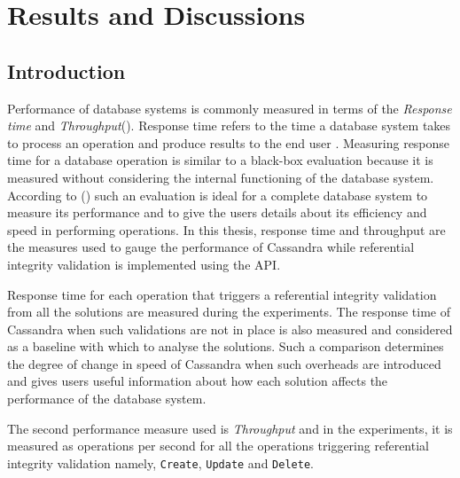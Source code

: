 \chapter{Results and Discussions}
\section{Introduction}
Performance of database systems is commonly measured in terms of the
\textit{Response time} and \textit{Throughput}().
Response time refers to the time  a database system takes to process an
operation and produce results to the end user . Measuring response time for a
database operation is similar to a black-box evaluation because it is measured
without considering the internal functioning  of the database system. According
to () such an evaluation is ideal for a complete database
system to measure its performance and to give the users details about its
efficiency and speed in performing operations. In this thesis, response time and
throughput are the measures used to gauge the performance of Cassandra while
referential integrity validation is implemented using the \ac{API}.

Response time for each  operation that triggers  a referential integrity
validation from all the solutions are measured during the experiments.
The response time of Cassandra when such validations
are not in place is also measured and considered as a baseline with which to
analyse the solutions. Such a comparison determines the degree of change in
speed of Cassandra when such overheads are introduced and gives users useful
information about how each solution affects the performance of the database
system.

The second performance measure used is \textit{Throughput} and in the
experiments, it is measured as operations per second for all the operations
triggering referential integrity validation namely, \texttt{Create},
\texttt{Update} and \texttt{Delete}.


